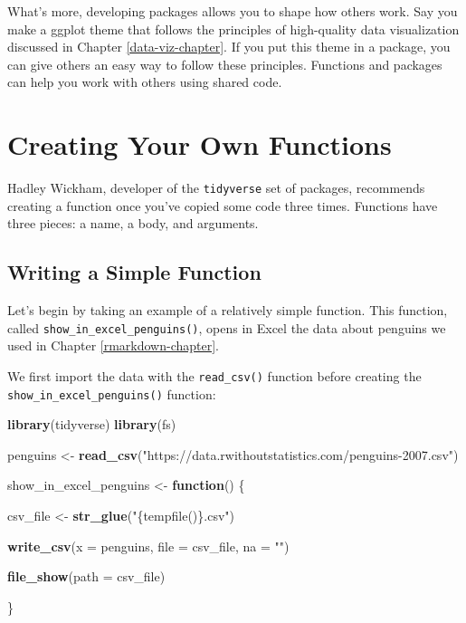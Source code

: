 \documentclass[
]{book}
\newenvironment{Shaded}{\begin{snugshade}}{\end{snugshade}}
\newcommand{\AttributeTok}[1]{\textcolor[rgb]{0.13,0.29,0.53}{#1}}
\newcommand{\ControlFlowTok}[1]{\textcolor[rgb]{0.13,0.29,0.53}{\textbf{#1}}}
\newcommand{\FunctionTok}[1]{\textcolor[rgb]{0.13,0.29,0.53}{\textbf{#1}}}
\newcommand{\NormalTok}[1]{#1}
\newcommand{\OtherTok}[1]{\textcolor[rgb]{0.56,0.35,0.01}{#1}}
\newcommand{\StringTok}[1]{\textcolor[rgb]{0.31,0.60,0.02}{#1}}
\begin{document}
What's more, developing packages allows you to shape how others work. Say you make a ggplot theme that follows the principles of high-quality data visualization discussed in Chapter \ref{data-viz-chapter}. If you put this theme in a package, you can give others an easy way to follow these principles. Functions and packages can help you work with others using shared code.

\hypertarget{creating-your-own-functions}{%
\section*{Creating Your Own Functions}\label{creating-your-own-functions}}

Hadley Wickham, developer of the \texttt{tidyverse} set of packages, recommends creating a function once you've copied some code three times. Functions have three pieces: a name, a body, and arguments.

\hypertarget{writing-a-simple-function}{%
\subsection*{Writing a Simple Function}\label{writing-a-simple-function}}

Let's begin by taking an example of a relatively simple function. This function, called \texttt{show\_in\_excel\_penguins()}, opens in Excel the data about penguins we used in Chapter \ref{rmarkdown-chapter}.

We first import the data with the \texttt{read\_csv()} function before creating the \texttt{show\_in\_excel\_penguins()} function:

\begin{Shaded}
\begin{Highlighting}[]
\FunctionTok{library}\NormalTok{(tidyverse)}
\FunctionTok{library}\NormalTok{(fs)}


\NormalTok{penguins }\OtherTok{\textless{}{-}} \FunctionTok{read\_csv}\NormalTok{(}\StringTok{"https://data.rwithoutstatistics.com/penguins{-}2007.csv"}\NormalTok{)}

\NormalTok{show\_in\_excel\_penguins }\OtherTok{\textless{}{-}} \ControlFlowTok{function}\NormalTok{() \{}
  
\NormalTok{  csv\_file }\OtherTok{\textless{}{-}} \FunctionTok{str\_glue}\NormalTok{(}\StringTok{"\{tempfile()\}.csv"}\NormalTok{)}
  
  \FunctionTok{write\_csv}\NormalTok{(}\AttributeTok{x =}\NormalTok{ penguins,}
            \AttributeTok{file =}\NormalTok{ csv\_file,}
            \AttributeTok{na =} \StringTok{""}\NormalTok{)}
  
  \FunctionTok{file\_show}\NormalTok{(}\AttributeTok{path =}\NormalTok{ csv\_file)}
  
\NormalTok{\}}
\end{Highlighting}
\end{Shaded}
\end{document}
